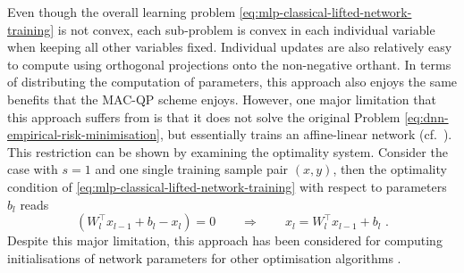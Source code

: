 Even though the overall learning problem \eqref{eq:mlp-classical-lifted-network-training} is not convex, each sub-problem is convex in each individual variable when keeping all other variables fixed. Individual updates are also relatively easy to compute using orthogonal projections onto the non-negative orthant. In terms of distributing the computation of parameters, this approach also enjoys the same benefits that the MAC-QP scheme enjoys.
However, one major limitation that this approach suffers from is that it does not solve the original Problem \eqref{eq:dnn-empirical-risk-minimisation}, but essentially trains an affine-linear network (cf.\ \cite{zach2019contrastive}). This restriction can be shown by examining the optimality system. Consider the case with $s=1$ and one single training sample pair $(x,y)$, then the optimality condition of \eqref{eq:mlp-classical-lifted-network-training} with respect to parameters $b_l$ reads
\begin{equation}\label{eq:optimality_condition_lifted_approach}
   (W_{l}^{\top} x_{l-1} + b_{l} - x_{l}) = 0 \qquad \Longrightarrow \qquad x_{l} = W_{l}^{\top} x_{l-1} + b_{l} \,\,.
\end{equation}
Despite this major limitation, this approach has been considered for computing initialisations of network parameters for other optimisation algorithms \cite{li2019lifted,zach2019contrastive}.


